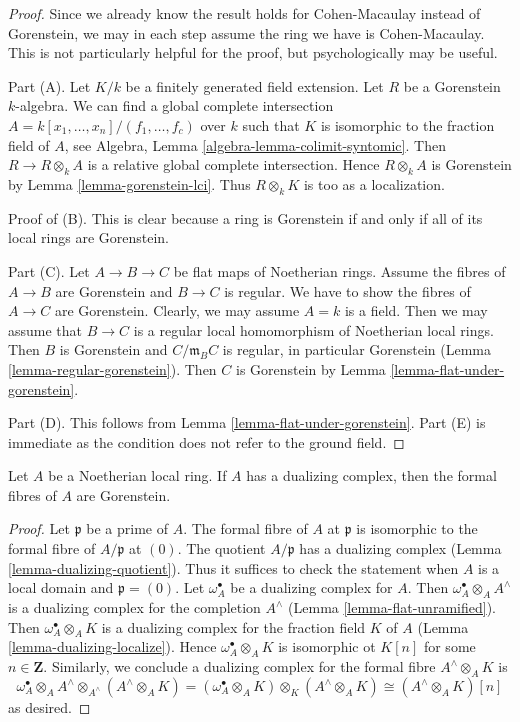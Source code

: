 \begin{proof}
Since we already know the result holds for Cohen-Macaulay instead
of Gorenstein, we may in each step assume the ring we have is
Cohen-Macaulay. This is not particularly helpful for the proof, but
psychologically may be useful.

\medskip\noindent
Part (A). Let $K/k$ be a finitely generated field extension.
Let $R$ be a Gorenstein $k$-algebra.
We can find a global complete intersection
$A = k[x_1, \ldots, x_n]/(f_1, \ldots, f_c)$
over $k$ such that $K$ is isomorphic to the fraction field of $A$, see
Algebra, Lemma \ref{algebra-lemma-colimit-syntomic}.
Then $R \to R \otimes_k A$ is a relative global complete intersection.
Hence $R \otimes_k A$ is Gorenstein by Lemma \ref{lemma-gorenstein-lci}.
Thus $R \otimes_k K$ is too as a localization.

\medskip\noindent
Proof of (B). This is clear because a ring is Gorenstein
if and only if all of its local rings are Gorenstein.

\medskip\noindent
Part (C). Let $A \to B \to C$ be flat maps of Noetherian rings.
Assume the fibres of $A \to B$ are Gorenstein and $B \to C$ is regular.
We have to show the fibres of $A \to C$ are Gorenstein.
Clearly, we may assume $A = k$ is a field. Then we may assume that
$B \to C$ is a regular local homomorphism of Noetherian local rings.
Then $B$ is Gorenstein and $C/\mathfrak m_B C$ is regular, in
particular Gorenstein (Lemma \ref{lemma-regular-gorenstein}).
Then $C$ is Gorenstein by
Lemma \ref{lemma-flat-under-gorenstein}.

\medskip\noindent
Part (D). This follows from Lemma \ref{lemma-flat-under-gorenstein}.
Part (E) is immediate as the condition does not refer to the ground field.
\end{proof}

\begin{lemma}
\label{lemma-dualizing-gorenstein-formal-fibres}
Let $A$ be a Noetherian local ring. If $A$ has a dualizing complex,
then the formal fibres of $A$ are Gorenstein.
\end{lemma}

\begin{proof}
Let $\mathfrak p$ be a prime of $A$. The formal fibre of $A$ at $\mathfrak p$
is isomorphic to the formal fibre of $A/\mathfrak p$ at $(0)$. The quotient
$A/\mathfrak p$ has a dualizing complex
(Lemma \ref{lemma-dualizing-quotient}).
Thus it suffices to check the statement
when $A$ is a local domain and $\mathfrak p = (0)$.
Let $\omega_A^\bullet$ be a dualizing complex for $A$. Then
$\omega_A^\bullet \otimes_A A^\wedge$ is a dualizing complex
for the completion $A^\wedge$
(Lemma \ref{lemma-flat-unramified}).
Then $\omega_A^\bullet \otimes_A K$ is a dualizing
complex for the fraction field $K$ of $A$
(Lemma \ref{lemma-dualizing-localize}).
Hence $\omega_A^\bullet \otimes_A K$
is isomorphic ot $K[n]$ for some $n \in \mathbf{Z}$.
Similarly, we conclude a dualizing complex for the formal fibre
$A^\wedge \otimes_A K$ is
$$
\omega_A^\bullet \otimes_A A^\wedge \otimes_{A^\wedge} (A^\wedge \otimes_A K) =
(\omega_A^\bullet \otimes_A K) \otimes_K (A^\wedge \otimes_A K) \cong
(A^\wedge \otimes_A K)[n]
$$
as desired.
\end{proof}

